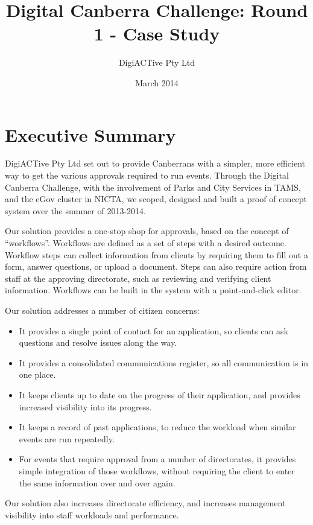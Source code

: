 \documentclass[12pt,a4paper,twosided]{article}
\title{Digital Canberra Challenge: Round 1 - Case Study}
\author{DigiACTive Pty Ltd}
\date{March 2014}
\begin{document}
\maketitle
\newpage
\section{Executive Summary}

DigiACTive Pty Ltd set out to provide Canberrans with a simpler, more
efficient way to get the various approvals required to run events.
Through the Digital Canberra Challenge, with the involvement of Parks and
City Services in TAMS, and the eGov cluster in NICTA, we scoped,
designed and built a proof of concept system over the summer of
2013-2014.

Our solution provides a one-stop shop for approvals, based on the
concept of ``workflows''. Workflows are defined as a set of steps with a
desired outcome. Workflow steps can collect information from clients by
requiring them to fill out a form, answer questions, or upload a
document. Steps can also require action from staff at the approving
directorate, such as reviewing and verifying client information.
Workflows can be built in the system with a point-and-click editor.

Our solution addresses a number of citizen concerns:

\begin{itemize}

\item
  It provides a single point of contact for an application, so clients
  can ask questions and resolve issues along the way.
\item
  It provides a consolidated communications register, so all
  communication is in one place.
\item
  It keeps clients up to date on the progress of their application, and
  provides increased visibility into its progress.
\item
  It keeps a record of past applications, to reduce the workload when
  similar events are run repeatedly.
\item
  For events that require approval from a number of directorates, it
  provides simple integration of those workflows, without requiring the
  client to enter the same information over and over again.
\end{itemize}

Our solution also increases directorate efficiency, and increases
management visibility into staff workloads and performance.
\end{document}
